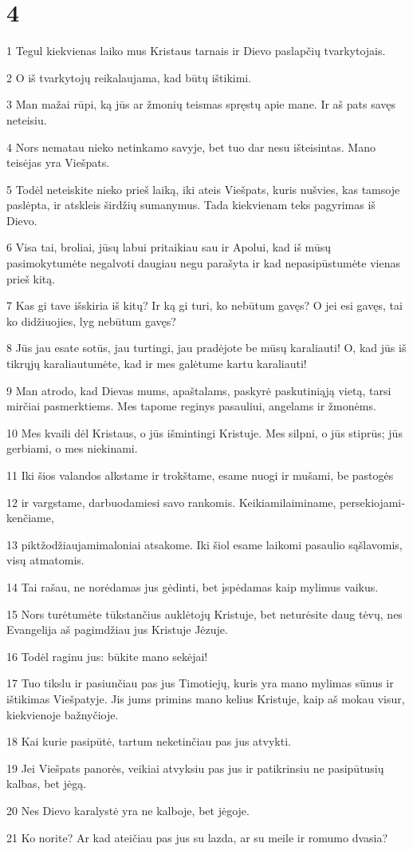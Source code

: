 \chapter{4}


\par 1 Tegul kiekvienas laiko mus Kristaus tarnais ir Dievo paslapčių tvarkytojais. 
\par 2 O iš tvarkytojų reikalaujama, kad būtų ištikimi. 
\par 3 Man mažai rūpi, ką jūs ar žmonių teismas spręstų apie mane. Ir aš pats savęs neteisiu. 
\par 4 Nors nematau nieko netinkamo savyje, bet tuo dar nesu išteisintas. Mano teisėjas yra Viešpats. 
\par 5 Todėl neteiskite nieko prieš laiką, iki ateis Viešpats, kuris nušvies, kas tamsoje paslėpta, ir atskleis širdžių sumanymus. Tada kiekvienam teks pagyrimas iš Dievo. 
\par 6 Visa tai, broliai, jūsų labui pritaikiau sau ir Apolui, kad iš mūsų pasimokytumėte negalvoti daugiau negu parašyta ir kad nepasipūstumėte vienas prieš kitą. 
\par 7 Kas gi tave išskiria iš kitų? Ir ką gi turi, ko nebūtum gavęs? O jei esi gavęs, tai ko didžiuojies, lyg nebūtum gavęs? 
\par 8 Jūs jau esate sotūs, jau turtingi, jau pradėjote be mūsų karaliauti! O, kad jūs iš tikrųjų karaliautumėte, kad ir mes galėtume kartu karaliauti! 
\par 9 Man atrodo, kad Dievas mums, apaštalams, paskyrė paskutiniąją vietą, tarsi mirčiai pasmerktiems. Mes tapome reginys pasauliui, angelams ir žmonėms. 
\par 10 Mes kvaili dėl Kristaus, o jūs išmintingi Kristuje. Mes silpni, o jūs stiprūs; jūs gerbiami, o mes niekinami. 
\par 11 Iki šios valandos alkstame ir trokštame, esame nuogi ir mušami, be pastogės 
\par 12 ir vargstame, darbuodamiesi savo rankomis. Keikiami­laiminame, persekiojami­kenčiame, 
\par 13 piktžodžiaujami­maloniai atsakome. Iki šiol esame laikomi pasaulio sąšlavomis, visų atmatomis. 
\par 14 Tai rašau, ne norėdamas jus gėdinti, bet įspėdamas kaip mylimus vaikus. 
\par 15 Nors turėtumėte tūkstančius auklėtojų Kristuje, bet neturėsite daug tėvų, nes Evangelija aš pagimdžiau jus Kristuje Jėzuje. 
\par 16 Todėl raginu jus: būkite mano sekėjai! 
\par 17 Tuo tikslu ir pasiunčiau pas jus Timotiejų, kuris yra mano mylimas sūnus ir ištikimas Viešpatyje. Jis jums primins mano kelius Kristuje, kaip aš mokau visur, kiekvienoje bažnyčioje. 
\par 18 Kai kurie pasipūtė, tartum neketinčiau pas jus atvykti. 
\par 19 Jei Viešpats panorės, veikiai atvyksiu pas jus ir patikrinsiu ne pasipūtusių kalbas, bet jėgą. 
\par 20 Nes Dievo karalystė yra ne kalboje, bet jėgoje. 
\par 21 Ko norite? Ar kad ateičiau pas jus su lazda, ar su meile ir romumo dvasia?


